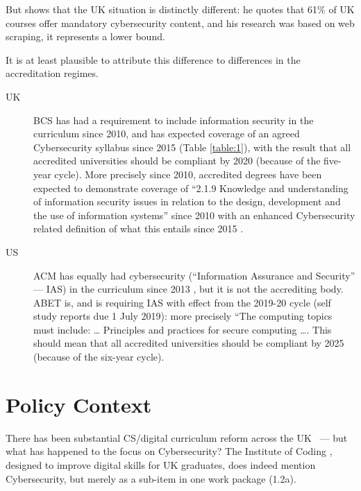 \documentclass[conference]{IEEEtran}
\begin{document}
But \cite[Table 1]{Ruiz2019a} shows that the UK situation is distinctly different: he quotes that 61\% of UK courses offer mandatory cybersecurity content, and his research was based on web scraping, it represents a lower bound.

It is at least plausible to attribute this difference to differences in the accreditation regimes.
\begin{description}
\item[UK]BCS has had a requirement to include information security in the curriculum since 2010, and has expected coverage of an agreed Cybersecurity syllabus since 2015 (Table \ref{table:1}), with the result that all accredited universities should be compliant by 2020 (because of the five-year cycle). More precisely since 2010, accredited degrees have been expected to demonstrate coverage of ``2.1.9 Knowledge and understanding of information security issues in relation to the design, development and the use of information  systems'' \cite[p.~30]{BCS2018a} since 2010 with an enhanced Cybersecurity related definition of what this entails since 2015 \cite[p.~17--18]{BCS2018a}.
\item[US]ACM has equally had cybersecurity (``Information Assurance and Security'' --- IAS) in the curriculum since 2013 \cite{ACM2013a}, but it is not the accrediting body. ABET is, and is requiring IAS with effect from the 2019-20 cycle (self study reports due 1 July 2019): more precisely \cite[Table 3]{Oudshoornetal2018a} ``The computing topics must include: \dots{} Principles and practices for secure computing \dots. This should mean that  all accredited universities should be compliant by 2025 (because of the six-year cycle).
\end{description}
\section{Policy Context}



There has been substantial CS/digital curriculum reform across the
UK~\cite{crick+sentance:2011,brown-et-al:sigcse2013,wgictreview:2013,brown-et-al:toce2014,moller+crick:jce2018}
--- but what has happened to the focus on Cybersecurity?  The Institute of Coding \cite{Davenportetal2019a}, designed to improve digital skills for UK graduates, does indeed mention Cybersecurity, but merely as a sub-item in one work package (1.2a).
\end{document}
